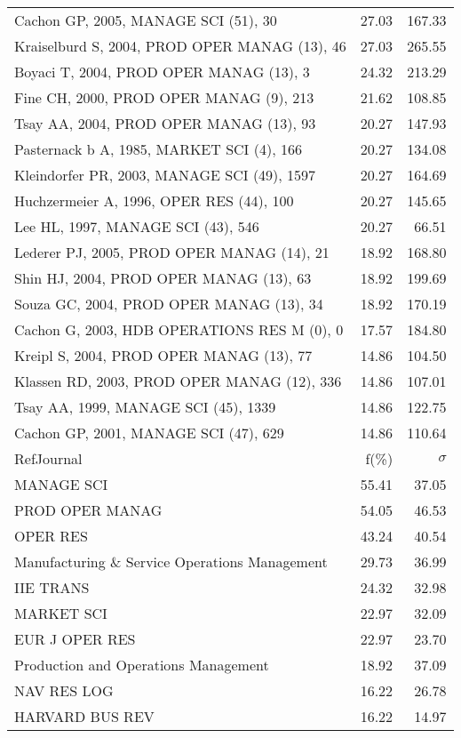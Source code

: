 \documentclass[a4paper,11pt]{report}
\begin{document}
\begin{landscape}
\begin{table}[!ht]
{\begin{tabular}{|l r r|}
Cachon GP, 2005, MANAGE SCI (51), 30 & 27.03 & 167.33\\
Kraiselburd S, 2004, PROD OPER MANAG (13), 46 & 27.03 & 265.55\\
Boyaci T, 2004, PROD OPER MANAG (13), 3 & 24.32 & 213.29\\
Fine CH, 2000, PROD OPER MANAG (9), 213 & 21.62 & 108.85\\
Tsay AA, 2004, PROD OPER MANAG (13), 93 & 20.27 & 147.93\\
Pasternack b A, 1985, MARKET SCI (4), 166 & 20.27 & 134.08\\
Kleindorfer PR, 2003, MANAGE SCI (49), 1597 & 20.27 & 164.69\\
Huchzermeier A, 1996, OPER RES (44), 100 & 20.27 & 145.65\\
Lee HL, 1997, MANAGE SCI (43), 546 & 20.27 & 66.51\\
Lederer PJ, 2005, PROD OPER MANAG (14), 21 & 18.92 & 168.80\\
Shin HJ, 2004, PROD OPER MANAG (13), 63 & 18.92 & 199.69\\
Souza GC, 2004, PROD OPER MANAG (13), 34 & 18.92 & 170.19\\
Cachon G, 2003, HDB OPERATIONS RES M (0), 0 & 17.57 & 184.80\\
Kreipl S, 2004, PROD OPER MANAG (13), 77 & 14.86 & 104.50\\
Klassen RD, 2003, PROD OPER MANAG (12), 336 & 14.86 & 107.01\\
Tsay AA, 1999, MANAGE SCI (45), 1339 & 14.86 & 122.75\\
Cachon GP, 2001, MANAGE SCI (47), 629 & 14.86 & 110.64\\
\hline
\hline
RefJournal & f(\%) & $\sigma$\\
\hline
MANAGE SCI & 55.41 & 37.05\\
PROD OPER MANAG & 54.05 & 46.53\\
OPER RES & 43.24 & 40.54\\
Manufacturing \& Service Operations Management & 29.73 & 36.99\\
IIE TRANS & 24.32 & 32.98\\
MARKET SCI & 22.97 & 32.09\\
EUR J OPER RES & 22.97 & 23.70\\
Production and Operations Management & 18.92 & 37.09\\
NAV RES LOG & 16.22 & 26.78\\
HARVARD BUS REV & 16.22 & 14.97\\
\hline
\end{tabular}
}
\end{table}


\end{landscape}
\end{document}
